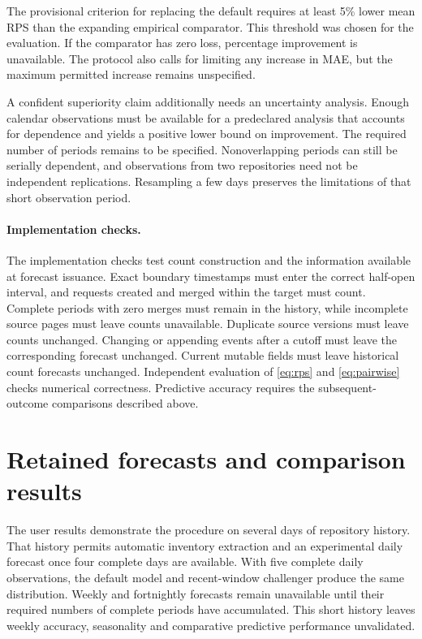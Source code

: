 \documentclass[11pt,a4paper]{article}
\begin{document}
The provisional criterion for replacing the default requires at least 5\% lower mean RPS than the expanding empirical comparator. This threshold was chosen for the evaluation. If the comparator has zero loss, percentage improvement is unavailable. The protocol also calls for limiting any increase in MAE, but the maximum permitted increase remains unspecified.

A confident superiority claim additionally needs an uncertainty analysis. Enough calendar observations must be available for a predeclared analysis that accounts for dependence and yields a positive lower bound on improvement. The required number of periods remains to be specified. Nonoverlapping periods can still be serially dependent, and observations from two repositories need not be independent replications. Resampling a few days preserves the limitations of that short observation period.

\paragraph{Implementation checks.}
The implementation checks test count construction and the information available at forecast issuance. Exact boundary timestamps must enter the correct half-open interval, and requests created and merged within the target must count. Complete periods with zero merges must remain in the history, while incomplete source pages must leave counts unavailable. Duplicate source versions must leave counts unchanged. Changing or appending events after a cutoff must leave the corresponding forecast unchanged. Current mutable fields must leave historical count forecasts unchanged. Independent evaluation of \eqref{eq:rps} and \eqref{eq:pairwise} checks numerical correctness. Predictive accuracy requires the subsequent-outcome comparisons described above.

\section{Retained forecasts and comparison results}

The user results demonstrate the procedure on several days of repository history. That history permits automatic inventory extraction and an experimental daily forecast once four complete days are available. With five complete daily observations, the default model and recent-window challenger produce the same distribution. Weekly and fortnightly forecasts remain unavailable until their required numbers of complete periods have accumulated. This short history leaves weekly accuracy, seasonality and comparative predictive performance unvalidated.
\end{document}

